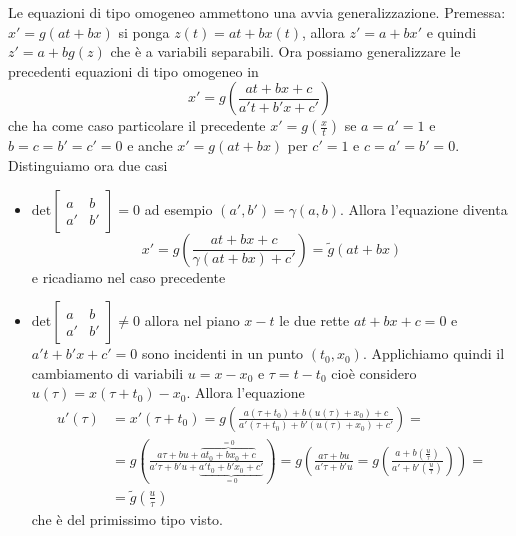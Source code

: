 Le equazioni di tipo omogeneo ammettono una avvia generalizzazione. Premessa:
\(x'= g{(at + bx)}\) si ponga \(z{(t)} = at + bx{(t)}\), allora \(z'= a+bx'\) e
quindi \(z' = a + bg{(z)}\) che è a variabili separabili.
Ora possiamo generalizzare le precedenti equazioni di tipo omogeneo in 
\[
    x' = g{\left( \frac{at + bx + c}{a't + b'x + c'} \right)} 
\]
che ha come caso particolare il precedente \(x' = g{\left( \frac{x}{t} \right)}
\) se \(a = a' = 1\) e \(b = c= b'= c'= 0\) e anche \(x' = g{(at + bx)}\) per
\(c'=1\) e \(c = a'=b'=0\). Distinguiamo ora due casi
\begin{itemize}[label = --]
    \item \(\text{det} \begin{bmatrix}
        a & b  \\
        a' & b'
    \end{bmatrix} = 0\) ad esempio \({(a', b')} = \gamma{(a, b)}\). Allora
    l'equazione diventa
    \[
        x' = g{\left( \frac{at + bx +c}{\gamma{(at + bx)} + c'} \right)} =
        \tilde{g}{(at+ bx)}
    \]
    e ricadiamo nel caso precedente
    \item \(\text{det}\begin{bmatrix}
        a & b \\
        a' & b'
    \end{bmatrix} \neq 0\) allora nel piano \(x-t\) le due rette \(at + bx + c =
    0\) e \(a't + b'x + c'= 0\) sono incidenti in un punto \({(t_{0}, x_{0})}\).
    Applichiamo quindi il cambiamento di variabili \(u = x - x_{0}\) e \(\tau =
    t -t_{0}\) cioè considero \(u{(\tau)} = x{(\tau + t_{0})}- x_{0}\). Allora
    l'equazione 
    \begin{align*}
        u'{(\tau)} &= x'{(\tau + t_{0})} = g{\left( \frac{a{(\tau + t_{0})} +
        b{(u{(\tau)} + x_{0})} + c}{a'{(\tau + t_{0})} + b'{(u{(\tau)} + x_{0})}
+ c'} \right)} = \\
                   &= g{\left( \frac{a\tau + bu + \overbrace{at_{0} + bx_{0} +
                           c}^{=0}}{a'\tau + b'u +
               \underbrace{a't_{0} + b'x_{0} + c'}_{=0} } \right)} = g{\left(
       \frac{a\tau + bu}{a'\tau + b'u} = g{\left( \frac{a + b{\left(
\frac{u}{\tau} \right)} }{a' + b'{\left( \frac{u}{\tau} \right)} } \right)}
\right)} = \\
    &= \tilde{g}{\left( \frac{u}{\tau} \right)} 
    \end{align*}
    che è del primissimo tipo visto.
\end{itemize}
